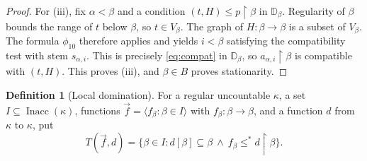 \documentclass[10pt,a4paper]{amsart}
\theoremstyle{definition}
\newtheorem{definition}[theorem]{Definition}
\theoremstyle{remark}
\newcommand{\D}{\mathbb D}
\DeclareMathOperator{\Inacc}{Inacc}
\begin{document}
\begin{proof}
For (iii), fix \(\alpha<\beta\) and a condition
\((t,H)\leq p\restriction\beta\) in \(\D_\beta\).
Regularity of \(\beta\) bounds the range of \(t\) below
\(\beta\), so \(t\in V_\beta\). The graph of
\(H:\beta\to\beta\) is a subset of \(V_\beta\). The formula \(\phi_{10}\)
therefore applies and yields \(i<\beta\) satisfying the
compatibility test with stem \(s_{\alpha,i}\). This is precisely
\eqref{eq:compat} in \(\D_\beta\), so
\(a_{\alpha,i}\restriction\beta\) is compatible with
\((t,H)\). This proves (iii), and \(\beta\in B\) proves
stationarity.
\end{proof}

\begin{definition}[Local domination]\label{def:domination}
For a regular uncountable \(\kappa\), a set
\(I\subseteq\Inacc(\kappa)\), functions
\(\vec f=\langle f_\beta:\beta\in I\rangle\) with
\(f_\beta:\beta\to\beta\), and a function \(d\) from \(\kappa\) to \(\kappa\), put
\[
 T(\vec f,d)=
 \{\beta\in I:d[\beta]\subseteq\beta
          \ \land\ f_\beta\leq^*d\restriction\beta\}.
\]
\end{definition}
\end{document}
